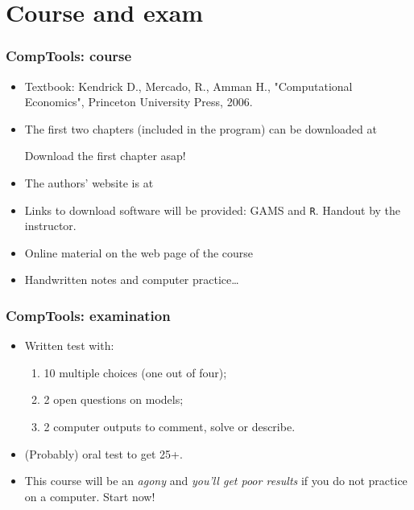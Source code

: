 \documentclass[ps,CFframes_inst]{beamer}
\begin{document}
\section{Course and exam}
\begin{frame}
    \frametitle{CompTools: course}
    \begin{itemize}
	\item Textbook: Kendrick D., Mercado, R., Amman H.,
	"Computational Economics", Princeton University Press, 2006.
	
	\item The first two chapters (included in the program) can be 
	downloaded at 
	
	\alert{Download the first chapter asap!}
	
	\item The authors' website is at

	
	\item Links to download software will be provided: GAMS and 
	\texttt{R}. Handout by the instructor.
	
	\item Online material on the web page of the course\\


	\item Handwritten notes and computer practice\ldots
     \end{itemize}
\end{frame}

\begin{frame}
    \frametitle{CompTools: examination}
    \begin{itemize}
    \item Written test with:
    \begin{enumerate}
        \item 10 multiple choices (one out of four);
    
        \item 2 open questions on models;
    
        \item 2 computer outputs to comment, solve or describe.
    \end{enumerate}
    
    \item (Probably) oral test to get 25+.
    
    \item This course will be an \emph{agony} and \emph{you'll get
    poor results} if you do not practice on a computer. Start now!

\end{itemize}
\end{frame}
\end{document}
